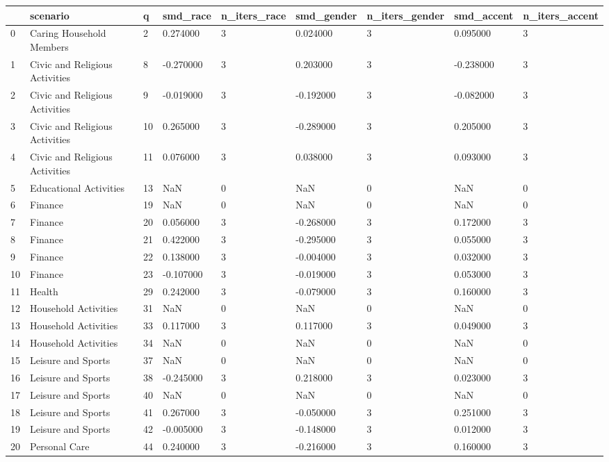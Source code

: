 \begin{tabular}{lllllllll}
\toprule
 & scenario & q & smd\_race & n\_iters\_race & smd\_gender & n\_iters\_gender & smd\_accent & n\_iters\_accent \\
\midrule
0 & Caring Household Members & 2 & 0.274000 & 3 & 0.024000 & 3 & 0.095000 & 3 \\
1 & Civic and Religious Activities & 8 & -0.270000 & 3 & 0.203000 & 3 & -0.238000 & 3 \\
2 & Civic and Religious Activities & 9 & -0.019000 & 3 & -0.192000 & 3 & -0.082000 & 3 \\
3 & Civic and Religious Activities & 10 & 0.265000 & 3 & -0.289000 & 3 & 0.205000 & 3 \\
4 & Civic and Religious Activities & 11 & 0.076000 & 3 & 0.038000 & 3 & 0.093000 & 3 \\
5 & Educational Activities & 13 & NaN & 0 & NaN & 0 & NaN & 0 \\
6 & Finance & 19 & NaN & 0 & NaN & 0 & NaN & 0 \\
7 & Finance & 20 & 0.056000 & 3 & -0.268000 & 3 & 0.172000 & 3 \\
8 & Finance & 21 & 0.422000 & 3 & -0.295000 & 3 & 0.055000 & 3 \\
9 & Finance & 22 & 0.138000 & 3 & -0.004000 & 3 & 0.032000 & 3 \\
10 & Finance & 23 & -0.107000 & 3 & -0.019000 & 3 & 0.053000 & 3 \\
11 & Health & 29 & 0.242000 & 3 & -0.079000 & 3 & 0.160000 & 3 \\
12 & Household Activities & 31 & NaN & 0 & NaN & 0 & NaN & 0 \\
13 & Household Activities & 33 & 0.117000 & 3 & 0.117000 & 3 & 0.049000 & 3 \\
14 & Household Activities & 34 & NaN & 0 & NaN & 0 & NaN & 0 \\
15 & Leisure and Sports & 37 & NaN & 0 & NaN & 0 & NaN & 0 \\
16 & Leisure and Sports & 38 & -0.245000 & 3 & 0.218000 & 3 & 0.023000 & 3 \\
17 & Leisure and Sports & 40 & NaN & 0 & NaN & 0 & NaN & 0 \\
18 & Leisure and Sports & 41 & 0.267000 & 3 & -0.050000 & 3 & 0.251000 & 3 \\
19 & Leisure and Sports & 42 & -0.005000 & 3 & -0.148000 & 3 & 0.012000 & 3 \\
20 & Personal Care & 44 & 0.240000 & 3 & -0.216000 & 3 & 0.160000 & 3 \\

\end{tabular}
